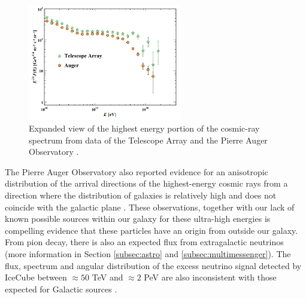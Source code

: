 \begin{figure}
\centering
\includegraphics[width=0.6\textwidth]{chapter3/img/ankle.png}
\caption{Expanded view of the highest energy portion of the cosmic-ray spectrum from data of the Telescope Array and the Pierre Auger Observatory \cite{PDG2018url}.}
\label{fig:ankle}
\end{figure}
The Pierre Auger Observatory also reported evidence for an anisotropic distribution of the arrival directions of the highest-energy cosmic rays from a direction where the distribution of galaxies is relatively high and does not coincide with the galactic plane \cite{Aab:2017tyv}. These observations, together with our lack of known possible sources within our galaxy for these ultra-high energies is compelling evidence that these particles have an origin from outside our galaxy. From pion decay, there is also an expected flux from extragalactic neutrinos (more information in Section \ref{subsec:astro} and \ref{subsec:multimessenger}). The flux, spectrum and angular distribution of the excess neutrino signal detected by IceCube between $\approx 50$ TeV and $\approx 2$ PeV are also inconsistent with those expected for Galactic sources \cite{Waxman:2013zda}.\\


